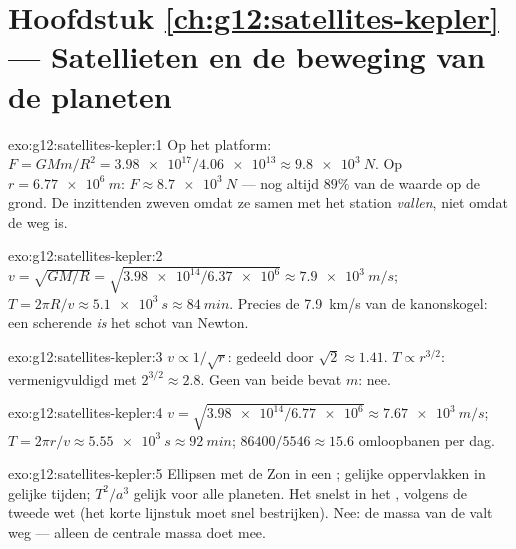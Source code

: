 \section*{Hoofdstuk \ref{ch:g12:satellites-kepler} --- Satellieten en de beweging van de planeten}

\begin{solution}{exo:g12:satellites-kepler:1}
Op het platform: $F = GMm/R^2 = \num{3.98e17}/\num{4.06e13} \approx
\qty{9.8e3}{N}$. Op $r = \qty{6.77e6}{m}$: $F \approx \qty{8.7e3}{N}$ ---
nog altijd $89\%$ van de waarde op de grond. De inzittenden zweven omdat ze
samen met het station \emph{vallen}, niet omdat de  weg is.
\end{solution}

\begin{solution}{exo:g12:satellites-kepler:2}
$v = \sqrt{GM/R} = \sqrt{\num{3.98e14}/\num{6.37e6}} \approx
\qty{7.9e3}{m/s}$; $T = 2\pi R/v \approx \qty{5.1e3}{s} \approx
\qty{84}{min}$. Precies de \qty{7.9}{km/s} van de kanonskogel: een scherende
 \emph{is} het schot van Newton.
\end{solution}

\begin{solution}{exo:g12:satellites-kepler:3}
$v \propto 1/\sqrt{r}$: gedeeld door $\sqrt 2 \approx 1.41$.
$T \propto r^{3/2}$: vermenigvuldigd met $2^{3/2} \approx 2.8$. Geen van
beide bevat $m$: nee.
\end{solution}

\begin{solution}{exo:g12:satellites-kepler:4}
$v = \sqrt{\num{3.98e14}/\num{6.77e6}} \approx \qty{7.67e3}{m/s}$;
$T = 2\pi r/v \approx \qty{5.55e3}{s} \approx \qty{92}{min}$;
$\num{86400}/5546 \approx 15.6$ omloopbanen per dag.
\end{solution}

\begin{solution}{exo:g12:satellites-kepler:5}
Ellipsen met de Zon in een ; gelijke oppervlakken in gelijke tijden;
$T^2/a^3$ gelijk voor alle planeten. Het snelst in het , volgens de
tweede wet (het korte lijnstuk moet snel bestrijken). Nee: de massa van de
 valt weg --- alleen de centrale massa doet mee.
\end{solution}

